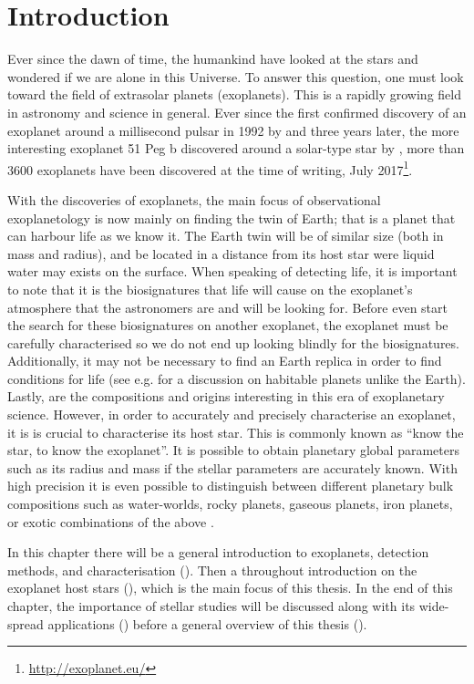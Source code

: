 \chapter{Introduction}
\label{cha:introduction}

Ever since the dawn of time, the humankind have looked at the stars and wondered if we are alone in
this Universe. To answer this question, one must look toward the field of extrasolar planets
(exoplanets). This is a rapidly growing field in astronomy and science in general. Ever since the
first confirmed discovery of an exoplanet around a millisecond pulsar in 1992 by
\citet{Wolszczan1992} and three years later, the more interesting exoplanet 51 Peg b discovered
around a solar-type star by \citet{Mayor1995}, more than 3600 exoplanets have been discovered at the
time of writing, July 2017\footnote{\url{http://exoplanet.eu/}}.

With the discoveries of exoplanets, the main focus of observational exoplanetology is now mainly on
finding the twin of Earth; that is a planet that can harbour life as we know it. The Earth twin will
be of similar size (both in mass and radius), and be located in a distance from its host star were
liquid water may exists on the surface. When speaking of detecting life, it is important to note
that it is the biosignatures that life will cause on the exoplanet's atmosphere that the astronomers
are and will be looking for. Before even start the search for these biosignatures on another
exoplanet, the exoplanet must be carefully characterised so we do not end up looking blindly for the
biosignatures. Additionally, it may not be necessary to find an Earth replica in order to find
conditions for life (see e.g. \citet{Alibert2014} for a discussion on habitable planets unlike the
Earth). Lastly, are the compositions and origins interesting in this era of exoplanetary science.
However, in order to accurately and precisely characterise an exoplanet, it is is crucial to
characterise its host star. This is commonly known as ``know the star, to know the exoplanet''. It
is possible to obtain planetary global parameters such as its radius and mass if the stellar
parameters are accurately known. With high precision it is even possible to distinguish between
different planetary bulk compositions such as water-worlds, rocky planets, gaseous planets, iron
planets, or exotic combinations of the above \citep[see e.g.][]{Dorn2015,Thiabaud2014}.

In this chapter there will be a general introduction to exoplanets, detection methods, and
characterisation (). Then a throughout introduction on the exoplanet host stars
(), which is the main focus of this thesis. In the end of this chapter,
the importance of stellar studies will be discussed along with its wide-spread applications
() before a general overview of this thesis ().



